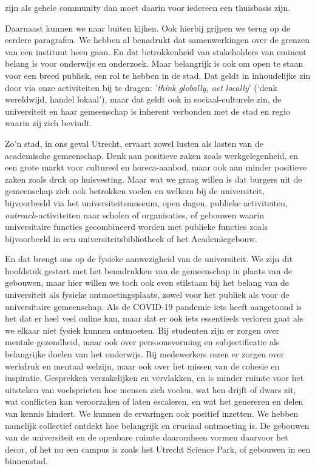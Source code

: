 \documentclass[smallauthor, chapterhaspagenum, nochapterinheader, pagenuminheader,  bigchapnum,medium2, tocpages,  garamond, titleinheader]{jote-book}
\begin{document}
zijn als gehele community dan moet daarin voor iedereen een thuisbasis zijn.



	Daarnaast kunnen we naar buiten kijken. Ook hierbij grijpen we terug op de eerdere paragrafen. We hebben al benadrukt dat samenwerkingen over de grenzen van een instituut heen gaan. En dat betrokkenheid van stakeholders van eminent belang is voor onderwijs en onderzoek. Maar belangrijk is ook om open te staan voor een breed publiek, een rol te hebben in de stad. Dat geldt in inhoudelijke zin door via onze activiteiten bij te dragen: '\emph{think}\emph{ }\emph{globally}\emph{, act }\emph{locally}' (‘denk wereldwijd, handel lokaal'), maar dat geldt ook in sociaal-culturele zin, de universiteit en haar gemeenschap is inherent verbonden met de stad en regio waarin zij zich bevindt.



	Zo'n stad, in ons geval Utrecht, ervaart zowel lusten als lasten van de academische gemeenschap. Denk aan positieve zaken zoals werkgelegenheid, en een grote markt voor cultureel en horeca-aanbod, maar ook aan minder positieve zaken zoals druk op huisvesting. Maar wat we graag willen is dat burgers uit de gemeenschap zich ook betrokken voelen en welkom bij de universiteit, bijvoorbeeld via het universiteitsmuseum, open dagen, publieke activiteiten, \emph{outreach}-activiteiten naar scholen of organisaties, of gebouwen waarin universitaire functies gecombineerd worden met publieke functies zoals bijvoorbeeld in een universiteitsbibliotheek of het Academiegebouw.



	En dat brengt ons op de fysieke aanwezigheid van de universiteit. We zijn dit hoofdstuk gestart met het benadrukken van de gemeenschap in plaats van de gebouwen, maar hier willen we toch ook even stilstaan bij het belang van de universiteit als fysieke ontmoetingsplaats, zowel voor het publiek als voor de universitaire gemeenschap. Als de COVID-19 pandemie iets heeft aangetoond is het dat er heel veel online kan, maar dat er ook iets essentieels verloren gaat als we elkaar niet fysiek kunnen ontmoeten. Bij studenten zijn er zorgen over mentale gezondheid, maar ook over persoonsvorming en subjectificatie als belangrijke doelen van het onderwijs. Bij medewerkers rezen er zorgen over werkdruk en mentaal welzijn, maar ook over het missen van de cohesie en inspiratie. Gesprekken verzakelijken en vervlakken, en is minder ruimte voor het uitsteken van voelsprieten hoe mensen zich voelen, wat hen drijft of dwars zit, wat conflicten kan veroorzaken of laten escaleren, en wat het genereren en delen van kennis hindert. We kunnen de ervaringen ook positief inzetten. We hebben namelijk collectief ontdekt hoe belangrijk en cruciaal ontmoeting is. De gebouwen van de universiteit en de openbare ruimte daaromheen vormen daarvoor het decor, of het nu een campus is zoals het Utrecht Science Park, of gebouwen in een binnenstad.
\end{document}
